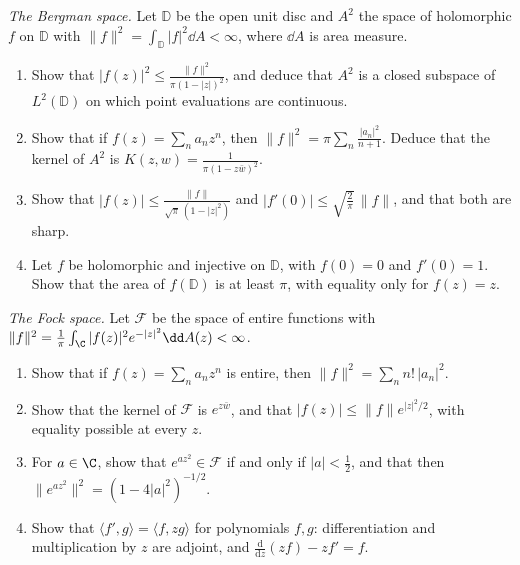 \begin{exercise}[$\star\star$]\label{pb:bergman}
\emph{The Bergman space.} Let $\mathbb D$ be the open unit disc and $A^2$ the space of holomorphic $f$ on $\mathbb D$ with $\|f\|^2=\int_{\mathbb D}|f|^2\dd A<\infty$,
where $\dd A$ is area measure.
\begin{enumerate}[label=(\alph*)]
\item Show that $|f(z)|^2\le\frac{\|f\|^2}{\pi(1-|z|)^2}$, and deduce that $A^2$ is a closed subspace of $L^2(\mathbb D)$ on which point evaluations are continuous.
\item Show that if $f(z)=\sum_na_nz^n$, then $\|f\|^2=\pi\sum_n\frac{|a_n|^2}{n+1}$. Deduce that the kernel of $A^2$ is $K(z,w)=\frac1{\pi(1-z\bar w)^2}$.
\item Show that $|f(z)|\le\frac{\|f\|}{\sqrt\pi\,(1-|z|^2)}$ and $|f'(0)|\le\sqrt{\frac2\pi}\,\|f\|$, and that both are sharp.
\item Let $f$ be holomorphic and injective on $\mathbb D$, with $f(0)=0$ and $f'(0)=1$. Show that the area of $f(\mathbb D)$ is at least $\pi$, with equality
only for $f(z)=z$.
\end{enumerate}
\end{exercise}

\begin{exercise}[$\star\star$]\label{pb:fock}
\emph{The Fock space.} Let $\mathcal F$ be the space of entire functions with $\|f\|^2=\frac1\pi\int_\C|f(z)|^2e^{-|z|^2}\dd A(z)<\infty$.
\begin{enumerate}[label=(\alph*)]
\item Show that if $f(z)=\sum_na_nz^n$ is entire, then $\|f\|^2=\sum_nn!\,|a_n|^2$.
\item Show that the kernel of $\mathcal F$ is $e^{z\bar w}$, and that $|f(z)|\le\|f\|e^{|z|^2/2}$, with equality possible at every $z$.
\item For $a\in\C$, show that $e^{az^2}\in\mathcal F$ if and only if $|a|<\frac12$, and that then $\|e^{az^2}\|^2=(1-4|a|^2)^{-1/2}$.
\item Show that $\langle f',g\rangle=\langle f,zg\rangle$ for polynomials $f,g$: differentiation and multiplication by $z$ are adjoint, and
$\frac{\mathrm d}{\mathrm dz}(zf)-zf'=f$.
\end{enumerate}
\end{exercise}


